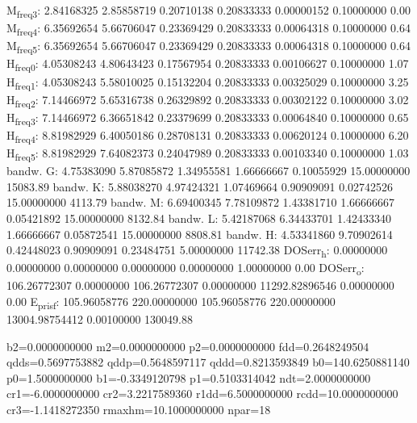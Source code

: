 \documentclass[11pt]{article}
\begin{document}
M\textsubscript{freq}\textsubscript{3}:   2.84168325   2.85858719   0.20710138   0.20833333   0.00000152   0.10000000         0.00
M\textsubscript{freq}\textsubscript{4}:   6.35692654   5.66706047   0.23369429   0.20833333   0.00064318   0.10000000         0.64
M\textsubscript{freq}\textsubscript{5}:   6.35692654   5.66706047   0.23369429   0.20833333   0.00064318   0.10000000         0.64
H\textsubscript{freq}\textsubscript{0}:   4.05308243   4.80643423   0.17567954   0.20833333   0.00106627   0.10000000         1.07
H\textsubscript{freq}\textsubscript{1}:   4.05308243   5.58010025   0.15132204   0.20833333   0.00325029   0.10000000         3.25
H\textsubscript{freq}\textsubscript{2}:   7.14466972   5.65316738   0.26329892   0.20833333   0.00302122   0.10000000         3.02
H\textsubscript{freq}\textsubscript{3}:   7.14466972   6.36651842   0.23379699   0.20833333   0.00064840   0.10000000         0.65
H\textsubscript{freq}\textsubscript{4}:   8.81982929   6.40050186   0.28708131   0.20833333   0.00620124   0.10000000         6.20
H\textsubscript{freq}\textsubscript{5}:   8.81982929   7.64082373   0.24047989   0.20833333   0.00103340   0.10000000         1.03
bandw. G:   4.75383090   5.87085872   1.34955581   1.66666667   0.10055929  15.00000000     15083.89
bandw. K:   5.88038270   4.97424321   1.07469664   0.90909091   0.02742526  15.00000000      4113.79
bandw. M:   6.69400345   7.78109872   1.43381710   1.66666667   0.05421892  15.00000000      8132.84
bandw. L:   5.42187068   6.34433701   1.42433340   1.66666667   0.05872541  15.00000000      8808.81
bandw. H:   4.53341860   9.70902614   0.42448023   0.90909091   0.23484751   5.00000000     11742.38
DOSerr\textsubscript{h}:   0.00000000   0.00000000   0.00000000   0.00000000   0.00000000   1.00000000         0.00
DOSerr\textsubscript{o}: 106.26772307   0.00000000 106.26772307   0.00000000 11292.82896546   0.00000000         0.00
E\textsubscript{pris}\textsubscript{f}: 105.96058776 220.00000000 105.96058776 220.00000000 13004.98754412   0.00100000    130049.88

b2=0.0000000000 m2=0.0000000000 p2=0.0000000000 fdd=0.2648249504 qdds=0.5697753882 qddp=0.5648597117 qddd=0.8213593849 b0=140.6250881140 p0=1.5000000000 b1=-0.3349120798 p1=0.5103314042 ndt=2.0000000000 cr1=-6.0000000000 cr2=3.2217589360 r1dd=6.5000000000 rcdd=10.0000000000 cr3=-1.1418272350 rmaxhm=10.1000000000 npar=18 
\end{document}
